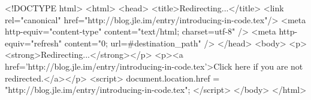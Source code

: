 <!DOCTYPE html>
<html>
<head>
<title>Redirecting...</title>
<link rel="canonical" href="http://blog.jle.im/entry/introducing-in-code.tex"/>
<meta http-equiv="content-type" content="text/html; charset=utf-8" />
<meta http-equiv="refresh" content="0; url=#{destination_path}" />
</head>
<body>
  <p><strong>Redirecting...</strong></p>
  <p><a href='http://blog.jle.im/entry/introducing-in-code.tex'>Click here if you are not redirected.</a></p>
  <script>
    document.location.href = "http://blog.jle.im/entry/introducing-in-code.tex";
  </script>
</body>
</html>
